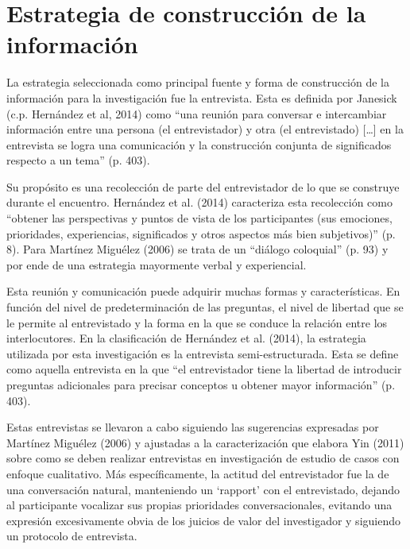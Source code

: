 \section{Estrategia de construcción de la información}
La estrategia seleccionada como principal fuente y forma de construcción de la
información para la investigación fue la entrevista.
Esta es definida por Janesick (c.p. Hernández et al, 2014) como “una reunión
para conversar e intercambiar información entre una persona (el entrevistador) y
otra (el entrevistado) […] en la entrevista se logra una comunicación y la
construcción conjunta de significados respecto a un tema” (p. 403).

Su propósito es una recolección de parte del entrevistador de lo que se construye
durante el encuentro. Hernández et al. (2014) caracteriza esta recolección como
“obtener las perspectivas y puntos de vista de los participantes (sus emociones,
prioridades, experiencias, significados y otros aspectos más bien subjetivos)”
(p. 8).
Para Martínez Miguélez (2006) se trata de un “diálogo coloquial” (p. 93) y por
ende de una estrategia mayormente verbal y experiencial.

Esta reunión y comunicación puede adquirir muchas formas y características.
En función del nivel de predeterminación de las preguntas, el nivel de libertad
que se le permite al entrevistado y la forma en la que se conduce la relación
entre los interlocutores.
En la clasificación de Hernández et al. (2014), la estrategia utilizada por
esta investigación es la entrevista semi-estructurada.
Esta se define como aquella entrevista en la que “el entrevistador tiene la
libertad de introducir preguntas adicionales para precisar conceptos u obtener
mayor información” (p. 403).

Estas entrevistas se llevaron a cabo siguiendo las sugerencias expresadas por
Martínez Miguélez (2006) y ajustadas a la caracterización que elabora Yin (2011)
sobre como se deben realizar entrevistas en investigación de estudio de casos
con enfoque cualitativo.
Más específicamente, la actitud del entrevistador fue la de una conversación
natural, manteniendo un ‘rapport’ con el entrevistado, dejando al participante
vocalizar sus propias prioridades conversacionales, evitando una expresión
excesivamente obvia de los juicios de valor del investigador y siguiendo un
protocolo de entrevista.

